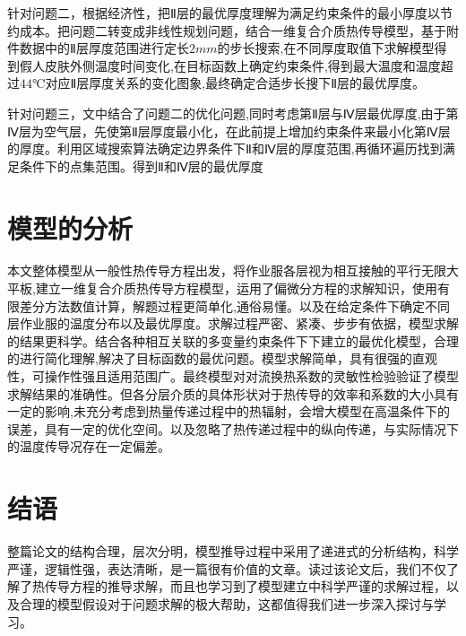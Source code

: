\documentclass{whutmod}
\begin{document}
针对问题二，根据经济性，把Ⅱ层的最优厚度理解为满足约束条件的最小厚度以节约成本。把问题二转变成非线性规划问题，结合一维复合介质热传导模型，基于附件数据中的Ⅱ层厚度范围进行定长$2mm$的步长搜索,在不同厚度取值下求解模型得到假人皮肤外侧温度时间变化,在目标函数上确定约束条件,得到最大温度和温度超过$44℃$对应Ⅱ层厚度关系的变化图象,最终确定合适步长搜下Ⅱ层的最优厚度。

针对问题三，文中结合了问题二的优化问题,同时考虑第Ⅱ层与Ⅳ层最优厚度,由于第Ⅳ层为空气层，先使第Ⅱ层厚度最小化，在此前提上增加约束条件来最小化第Ⅳ层的厚度。利用区域搜索算法确定边界条件下Ⅱ和Ⅳ层的厚度范围,再循环遍历找到满足条件下的点集范围。得到Ⅱ和Ⅳ层的最优厚度


\section{模型的分析}
本文整体模型从一般性热传导方程出发，将作业服各层视为相互接触的平行无限大平板,建立一维复合介质热传导方程模型，运用了偏微分方程的求解知识，使用有限差分方法数值计算，解题过程更简单化,通俗易懂。以及在给定条件下确定不同层作业服的温度分布以及最优厚度。求解过程严密、紧凑、步步有依据，模型求解的结果更科学。结合各种相互关联的多变量约束条件下下建立的最优化模型，合理的进行简化理解,解决了目标函数的最优问题。模型求解简单，具有很强的直观性，可操作性强且适用范围广。最终模型对对流换热系数的灵敏性检验验证了模型求解结果的准确性。但各分层介质的具体形状对于热传导的效率和系数的大小具有一定的影响,未充分考虑到热量传递过程中的热辐射，会增大模型在高温条件下的误差，具有一定的优化空间。以及忽略了热传递过程中的纵向传递，与实际情况下的温度传导况存在一定偏差。


\section{结语}
整篇论文的结构合理，层次分明，模型推导过程中采用了递进式的分析结构，科学严谨，逻辑性强，表达清晰，是一篇很有价值的文章。读过该论文后，我们不仅了解了热传导方程的推导求解，而且也学习到了模型建立中科学严谨的求解过程，以及合理的模型假设对于问题求解的极大帮助，这都值得我们进一步深入探讨与学习。
\end{document}
